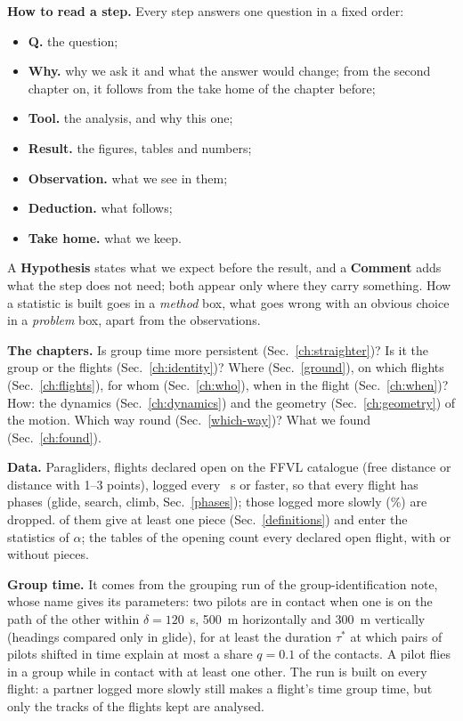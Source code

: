 \documentclass[10pt,a4paper]{article}
\begin{document}
\textbf{How to read a step.} Every step answers one question in a fixed order:
\begin{itemize}
\item \textbf{Q.} the question;
\item \textbf{Why.} why we ask it and what the answer would change; from the second chapter on, it follows from
  the take home of the chapter before;
\item \textbf{Tool.} the analysis, and why this one;
\item \textbf{Result.} the figures, tables and numbers;
\item \textbf{Observation.} what we see in them;
\item \textbf{Deduction.} what follows;
\item \textbf{Take home.} what we keep.
\end{itemize}
A \textbf{Hypothesis} states what we expect before the result, and a \textbf{Comment} adds what the step does not
need; both appear only where they carry something. How a statistic is built goes in a \emph{method} box, what goes
wrong with an obvious choice in a \emph{problem} box, apart from the observations.

\textbf{The chapters.} Is group time more persistent (Sec.~\ref{ch:straighter})? Is it the group or the flights
(Sec.~\ref{ch:identity})? Where (Sec.~\ref{ground}), on which flights (Sec.~\ref{ch:flights}), for whom
(Sec.~\ref{ch:who}), when in the flight (Sec.~\ref{ch:when})? How: the dynamics (Sec.~\ref{ch:dynamics}) and the
geometry (Sec.~\ref{ch:geometry}) of the motion. Which way round (Sec.~\ref{which-way})? What we found
(Sec.~\ref{ch:found}).

\textbf{Data.} Paragliders, flights declared open on the FFVL catalogue (free distance or distance with 1--3
points), logged every \DtMax~s or faster, so that every flight has phases (glide, search, climb,
Sec.~\ref{phases}); those logged more slowly (\DtDroppedPercent\%) are dropped. \DtFlights{} of them give at least
one piece (Sec.~\ref{definitions}) and enter the statistics of $\alpha$; the tables of the opening count every
declared open flight, with or without pieces.

\textbf{Group time.} It comes from the grouping run of the group-identification note, whose name gives its
parameters: two pilots are in contact when one is on the path of the other within $\delta=120$~s, 500~m
horizontally and 300~m vertically (headings compared only in glide), for at least the duration $\tau^*$ at which
pairs of pilots shifted in time explain at most a share $q=0.1$ of the contacts. A pilot flies in a group while
in contact with at least one other. The run is built on every flight: a partner logged more slowly still makes a
flight's time group time, but only the tracks of the flights kept are analysed.
\end{document}
